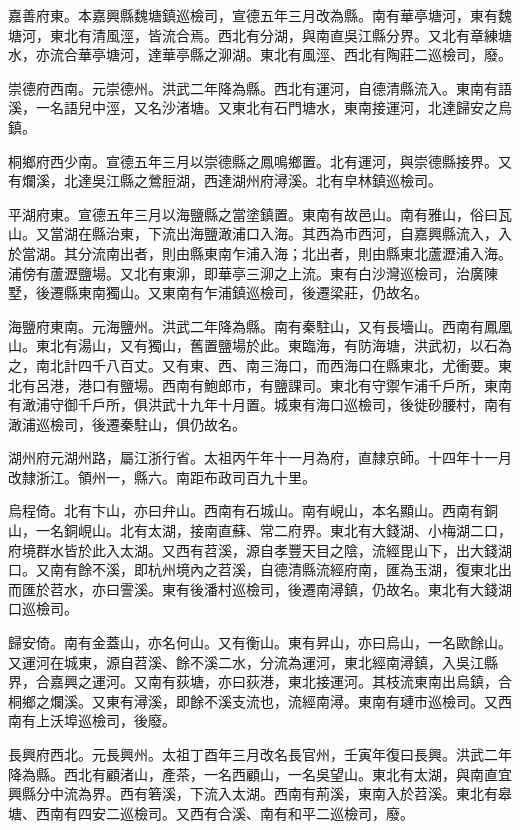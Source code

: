 嘉善府東。本嘉興縣魏塘鎮巡檢司，宣德五年三月改為縣。南有華亭塘河，東有魏塘河，東北有清風涇，皆流合焉。西北有分湖，與南直吳江縣分界。又北有章練塘水，亦流合華亭塘河，達華亭縣之泖湖。東北有風涇、西北有陶莊二巡檢司，廢。

崇德府西南。元崇德州。洪武二年降為縣。西北有運河，自德清縣流入。東南有語溪，一名語兒中涇，又名沙渚塘。又東北有石門塘水，東南接運河，北達歸安之烏鎮。

桐鄉府西少南。宣德五年三月以崇德縣之鳳鳴鄉置。北有運河，與崇德縣接界。又有爛溪，北達吳江縣之鶯脰湖，西達湖州府潯溪。北有皁林鎮巡檢司。

平湖府東。宣德五年三月以海鹽縣之當塗鎮置。東南有故邑山。南有雅山，俗曰瓦山。又當湖在縣治東，下流出海鹽澉浦口入海。其西為市西河，自嘉興縣流入，入於當湖。其分流南出者，則由縣東南乍浦入海；北出者，則由縣東北蘆瀝浦入海。浦傍有蘆瀝鹽場。又北有東泖，即華亭三泖之上流。東有白沙灣巡檢司，治廣陳墅，後遷縣東南獨山。又東南有乍浦鎮巡檢司，後遷梁莊，仍故名。

海鹽府東南。元海鹽州。洪武二年降為縣。南有秦駐山，又有長墻山。西南有鳳凰山。東北有湯山，又有獨山，舊置鹽場於此。東臨海，有防海塘，洪武初，以石為之，南北計四千八百丈。又有東、西、南三海口，而西海口在縣東北，尤衝要。東北有呂港，港口有鹽場。西南有鮑郎市，有鹽課司。東北有守禦乍浦千戶所，東南有澉浦守御千戶所，俱洪武十九年十月置。城東有海口巡檢司，後徙砂腰村，南有澉浦巡檢司，後遷秦駐山，俱仍故名。

湖州府元湖州路，屬江浙行省。太祖丙午年十一月為府，直隸京師。十四年十一月改隸浙江。領州一，縣六。南距布政司百九十里。

烏程倚。北有卞山，亦曰弁山。西南有石城山。南有峴山，本名顯山。西南有銅山，一名銅峴山。北有太湖，接南直蘇、常二府界。東北有大錢湖、小梅湖二口，府境群水皆於此入太湖。又西有苕溪，源自孝豐天目之陰，流經毘山下，出大錢湖口。又南有餘不溪，即杭州境內之苕溪，自德清縣流經府南，匯為玉湖，復東北出而匯於苕水，亦曰霅溪。東有後潘村巡檢司，後遷南潯鎮，仍故名。東北有大錢湖口巡檢司。

歸安倚。南有金蓋山，亦名何山。又有衡山。東有昇山，亦曰烏山，一名歐餘山。又運河在城東，源自苕溪、餘不溪二水，分流為運河，東北經南潯鎮，入吳江縣界，合嘉興之運河。又南有荻塘，亦曰荻港，東北接運河。其枝流東南出烏鎮，合桐鄉之爛溪。又東有潯溪，即餘不溪支流也，流經南潯。東南有璉市巡檢司。又西南有上沃埠巡檢司，後廢。

長興府西北。元長興州。太祖丁酉年三月改名長官州，壬寅年復曰長興。洪武二年降為縣。西北有顧渚山，產茶，一名西顧山，一名吳望山。東北有太湖，與南直宜興縣分中流為界。西有箬溪，下流入太湖。西南有荊溪，東南入於苕溪。東北有皋塘、西南有四安二巡檢司。又西有合溪、南有和平二巡檢司，廢。

